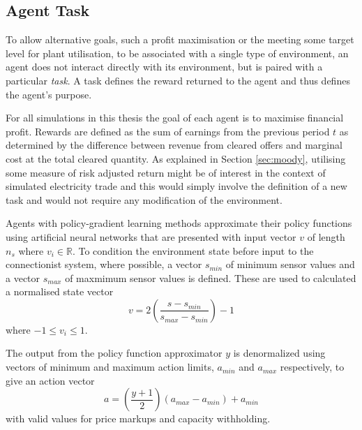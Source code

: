 \subsection{Agent Task}
To allow alternative goals, such a profit maximisation or the meeting some
target level for plant utilisation, to be associated with a single type of
environment, an agent does not interact directly with its environment, but is
paired with a particular \textit{task}. A task defines the reward returned to
the agent and thus defines the agent's purpose.

For all simulations in this thesis the goal of each agent is to maximise
financial profit.  Rewards are defined as the sum of earnings from
the previous period $t$ as determined by the difference between revenue from
cleared offers and marginal cost at the total cleared quantity.  As explained in
Section \ref{sec:moody}, utilising some measure of risk adjusted return might be
of interest in the context of simulated electricity trade and this would simply
involve the definition of a new task and would not require any modification of
the environment.


Agents with policy-gradient learning methods approximate their policy functions
using artificial neural networks that are presented with input vector $v$ of
length $n_s$ where $v_i \in \mathbb{R}$.  To condition the environment state
before input to the connectionist system, where possible, a vector $s_{min}$
of minimum sensor values and a vector $s_{max}$ of maxmimum sensor values is
defined.  These are used to calculated a normalised state vector
\begin{equation}
v = 2\left(\frac{s - s_{min}}{s_{max} - s_{min}}\right) - 1
\end{equation}
where $-1 \leq v_i \leq 1$.

The output from the policy function approximator $y$ is denormalized using
vectors of minimum and maximum action limits, $a_{min}$ and $a_{max}$
respectively, to give an action vector
\begin{equation}
a = \left(\frac{y + 1}{2}\right)(a_{max} - a_{min}) + a_{min}
\end{equation}
with valid values for price markups and capacity withholding.

